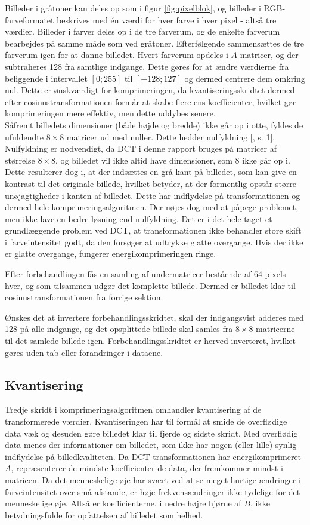 Billeder i gråtoner kan deles op som i figur \vref{fig:pixelblok}, og billeder i RGB-farveformatet beskrives med én værdi for hver farve i hver pixel - altså tre værdier. Billeder i farver deles op i de tre farverum, og de enkelte farverum bearbejdes på samme måde som ved gråtoner. Efterfølgende sammensættes de tre farverum igen for at danne billedet.
Hvert farverum opdeles i $A$-matricer, og der subtraheres 128 fra samtlige indgange. Dette gøres for at ændre værdierne fra beliggende i intervallet $[0;255]$ til $[-128;127]$ og dermed centrere dem omkring nul. Dette er ønskværdigt for komprimeringen, da kvantiseringsskridtet dermed efter cosinustransformationen formår at skabe flere ens koefficienter, hvilket gør komprimeringen mere effektiv, men dette uddybes senere.\\
Såfremt billedets dimensioner (både højde og bredde) ikke går op i otte, fyldes de ufuldendte $8 \times 8$ matricer ud med nuller. Dette hedder nulfyldning [\citet{zero_padding}, s. 1]. Nulfyldning er nødvendigt, da DCT i denne rapport bruges på matricer af størrelse $8\times8$, og billedet vil ikke altid have dimensioner, som 8 ikke går op i. Dette resulterer dog i, at der indsættes en grå kant på billedet, som kan give en kontrast til det originale billede, hvilket betyder, at der formentlig opstår større unøjagtigheder i kanten af billedet. Dette har indflydelse på transformationen og dermed hele komprimeringsalgoritmen. Der nøjes dog med at påpege problemet, men ikke lave en bedre løsning end nulfyldning. Det er i det hele taget et grundlæggende problem ved DCT, at transformationen ikke behandler store skift i farveintensitet godt, da den forsøger at udtrykke glatte overgange. Hvis der ikke er glatte overgange, fungerer energikomprimeringen ringe.

Efter forbehandlingen fås en samling af undermatricer bestående af 64 pixels hver, og som tilsammen udgør det komplette billede. Dermed er billedet klar til cosinustransformationen fra forrige sektion.

Ønskes det at invertere forbehandlingsskridtet, skal der indgangsvist adderes med 128 på alle indgange, og det opsplittede billede skal samles fra $8 \times 8$ matricerne til det samlede billede igen. Forbehandlingsskridtet er herved inverteret, hvilket gøres uden tab eller forandringer i dataene.
\subsection{Kvantisering}\label{sec:kvantisering}
Tredje skridt i komprimeringsalgoritmen omhandler kvantisering af de transformerede værdier. Kvantiseringen har til formål at smide de overflødige data væk og desuden gøre billedet klar til fjerde og sidste skridt. Med overflødig data menes der informationer om billedet, som ikke har nogen (eller lille) synlig indflydelse på billedkvaliteten. Da DCT-transformationen har energikomprimeret $A$, repræsenterer de mindste koefficienter de data, der fremkommer mindst i matricen. Da det menneskelige øje har svært ved at se meget hurtige ændringer i farveintensitet over små afstande, er høje frekvensændringer ikke tydelige for det menneskelige øje. Altså er koefficienterne, i nedre højre hjørne af $B$, ikke betydningsfulde for opfattelsen af billedet som helhed.

